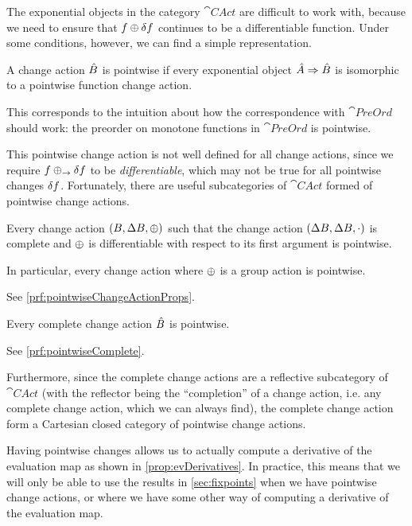 The exponential objects in the category $\cat{CAct}$ are difficult to work with,
because we need to ensure that $f \oplus \delta f$ continues to be a
differentiable function. Under some conditions, however, we can find a simple representation.

\begin{defn}
  \label{def:pointwiseChangeActions}
  A change action $\hat{B}$ is pointwise if every exponential object
  ${\hat{A}} \Rightarrow {\hat{B}}$ is isomorphic to a pointwise function change action.
\end{defn}

This corresponds to the intuition about how the correspondence with
$\cat{PreOrd}$ should work: the preorder on monotone functions in $\cat{PreOrd}$ is
pointwise.

This pointwise change action is not well defined for all change actions, since
we require $f \oplus_\rightarrow \delta f$ to be \emph{differentiable}, which
may not be true for all pointwise changes $\delta f$.
Fortunately, there are useful subcategories of $\cat{CAct}$ formed of pointwise change actions.

\begin{prop}[name=Pointwise change actions, restate=pointwiseChangeActionProps]
  \label{prop:pointwiseChangeActionProps}
  Every change action $(B,\Delta B,\oplus)$ such that the change action
  $(\Delta B,\Delta B,\cdot)$ is complete and $\oplus$ is differentiable with
  respect to its first argument is pointwise.

  In particular, every change action where $\oplus$ is a group action is pointwise.
\end{prop}
\ifproofs
  See \cref{prf:pointwiseChangeActionProps}.
\fi

\begin{prop}[name=Complete implies pointwise, restate=pointwiseComplete]
  \label{prop:pointwiseComplete}
   Every complete change action $\hat{B}$ is pointwise.
\end{prop}
\ifproofs
  See \cref{prf:pointwiseComplete}.
\fi

Furthermore, since the complete change actions are a reflective subcategory of
$\cat{CAct}$ (with the reflector being the ``completion'' of a change action,
i.e. any complete change action, which we can always find), the complete change
action form a Cartesian closed category of pointwise change actions.

Having pointwise changes allows us to actually compute a derivative of the
evaluation map as shown in \cref{prop:evDerivatives}. In practice, this means
that we will only be able to use the results in \cref{sec:fixpoints} when
we have pointwise change actions, or where we have some other way of computing
a derivative of the evaluation map.

